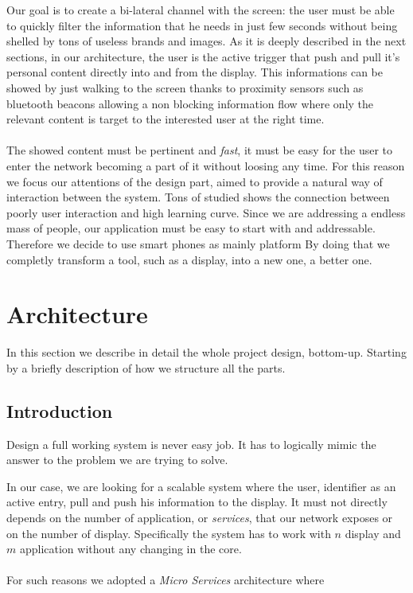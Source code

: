 \documentclass[]{usiinfbachelorproject}
\begin{document}
Our goal is to create a bi-lateral channel with the screen: the user must be able to quickly filter the information that he needs in just few seconds without being shelled by tons of useless brands and images. As it is deeply described in the next sections, in our architecture, the user is the active trigger that push and pull it's personal content directly into and from the display. This informations can be showed by just walking to the screen thanks to proximity sensors such as bluetooth beacons allowing a non blocking information flow where only the relevant content is target to the interested user at the right time.
\\
\\
The showed content must be pertinent and \emph{fast}, it must be easy for the user to enter the network becoming a part of it without loosing any time. For this reason we focus our attentions of the design part, aimed to provide a natural way of interaction between the system. Tons of studied shows the connection between poorly user interaction and high learning curve. Since we are addressing a endless mass of people, our application must be easy to start with and addressable. Therefore we decide to use smart phones as mainly platform
By doing that we completly transform a tool, such as a display, into a new one, a better one.
\section{Architecture}
In this section we describe in detail the whole project design, bottom-up. Starting by a briefly description of how we structure all the parts.
\subsection{Introduction}
Design a full working system is never easy job. It has to logically mimic the answer to the problem we are trying to solve.

In our case, we are looking for a scalable system where the user, identifier as an active entry, pull and push his information to the display. It must not directly depends on the number of application, or \emph{services}, that our network exposes or on the number of display. Specifically the system has to work with $n$ display and $m$ application without any changing in the core. 
\\
\\
For such reasons we adopted a \emph{Micro Services} architecture where 
\end{document}
